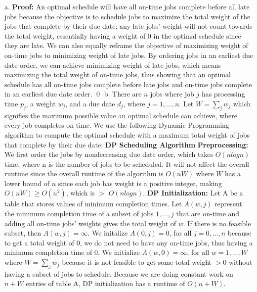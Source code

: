 \documentclass[oneside]{homework} %
\begin{document}
{\large a.} \textbf{Proof:} An optimal schedule will have all on-time jobs complete before all late jobs because the objective is to schedule jobs to maximize the total weight of the jobs that complete by their due date; any late jobs' weight will not count towards the total weight,  essentially having a weight of 0 in the optimal schedule since they are late. We can also equally reframe the objective of maximizing weight of on-time jobs to minimizing weight of late jobs. By ordering jobs in an earliest due date order, we can achieve minimizing weight of late jobs, which means maximizing the total weight of on-time jobs, thus showing that an optimal schedule has all on-time jobs complete before late jobs and on-time jobs complete in an earliest due date order. \hfill\qed
\newline
\newline
{\large b.} There are $n$ jobs where job $j$ has processing time $p_j$, a weight $w_j$, and a due date $d_j$, where $j = 1,...,n$. Let $W = \sum\limits_{j}w_j$ which signifies the maximum possible value an optimal schedule can achieve, where every job completes on time. We use the following Dynamic Programming algorithm to compute the optimal schedule with a maximum total weight of jobs that complete by their due date:
\newline
\newline
\textbf{DP Scheduling Algorithm}
\newline
\newline
\textbf{Preprocessing:} We first order the jobs by nondecreasing due date order, which takes $O(nlogn)$ time, where n is the number of jobs to be scheduled. It will not affect the overall runtime since the overall runtime of the algorithm is $O(nW)$ where $W$ has a lower bound of $n$ since each job has weight is a positive integer, making $O(nW) \geq O(n^2)$, which is $>$ $O(nlogn)$.
\newline
\newline
\textbf{DP Initialization:} Let A be a table that stores values of minimum completion times. Let $A(w, j)$ represent the minimum completion time of a subset of jobs $1,...,j$ that are on-time and adding all on-time jobs' weights gives the total weight of $w$. If there is no feasible subset, then $A(w,j) = \infty$. We initalize $A(0,j) = 0$, for all $j = 0,...,n$ because to get a total weight of 0, we do not need to have any on-time jobs, thus having a minimum completion time of 0. We initialize $A(w,0) = \infty$, for all $w = 1,...,W$ where $W = \sum\limits_{j}w_j$ because it is not feasible to get some total weight $> 0$ without having a subset of jobs to schedule. Because we are doing constant work on $n + W$ entries of table A, DP initialization has a runtime of $O(n + W)$.
\end{document}
